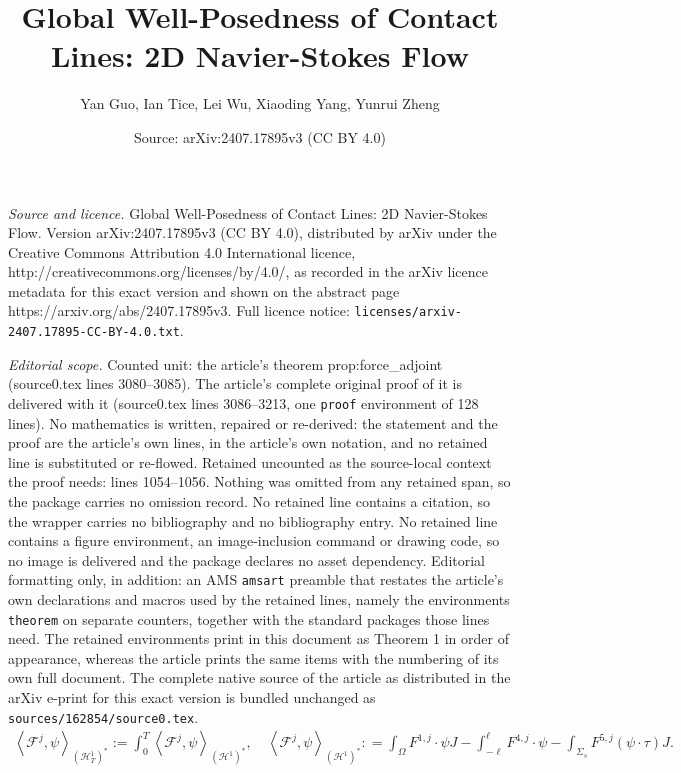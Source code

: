 \documentclass[10pt,a4paper]{amsart}
\title{Global Well-Posedness of Contact Lines: 2D Navier-Stokes Flow}
\author{Yan Guo, Ian Tice, Lei Wu, Xiaoding Yang, Yunrui Zheng}
\date{Source: arXiv:2407.17895v3 (CC BY 4.0)}
\def\Om{\Omega}
\begin{document}
\maketitle

\noindent\emph{Source and licence.} Global Well-Posedness of Contact Lines: 2D Navier-Stokes Flow. Version arXiv:2407.17895v3 (CC BY 4.0), distributed by arXiv under the Creative Commons Attribution 4.0 International licence, http://creativecommons.org/licenses/by/4.0/, as recorded in the arXiv licence metadata for this exact version and shown on the abstract page https://arxiv.org/abs/2407.17895v3. Full licence notice: \texttt{licenses/arxiv-2407.17895-CC-BY-4.0.txt}.\par\smallskip

\noindent\textit{Editorial scope.} Counted unit: the article's theorem prop:force\_adjoint (source0.tex lines 3080--3085). The article's complete original proof of it is delivered with it (source0.tex lines 3086--3213, one \texttt{proof} environment of 128 lines). No mathematics is written, repaired or re-derived: the statement and the proof are the article's own lines, in the article's own notation, and no retained line is substituted or re-flowed.  Retained uncounted as the source-local context the proof needs: lines 1054--1056.  Nothing was omitted from any retained span, so the package carries no omission record.  No retained line contains a citation, so the wrapper carries no bibliography and no bibliography entry.  No retained line contains a figure environment, an image-inclusion command or drawing code, so no image is delivered and the package declares no asset dependency.  Editorial formatting only, in addition: an AMS \texttt{amsart} preamble that restates the article's own declarations and macros used by the retained lines, namely the environments \texttt{theorem} on separate counters, together with the standard packages those lines need.  The retained environments print in this document as Theorem 1 in order of appearance, whereas the article prints the same items with the numbering of its own full document.  The complete native source of the article as distributed in the arXiv e-print for this exact version is bundled unchanged as \texttt{sources/162854/source0.tex}.
	\begin{align}\label{duality}
		\left<\mathcal{F}^j,\psi\right>_{(\mathcal{H}^1_T)^\ast} :=\int_0^T\left<\mathcal{F}^j,\psi\right>_{(\mathcal{H}^1)^\ast},\quad \left<\mathcal{F}^j,\psi\right>_{(\mathcal{H}^1)^\ast}: =\int_{\Om}F^{1,j}\cdot \psi J-\int_{-\ell}^{\ell}F^{4,j}\cdot \psi-\int_{\Sigma_s}F^{5,j}(\psi\cdot\tau)J.
	\end{align}
\end{document}
